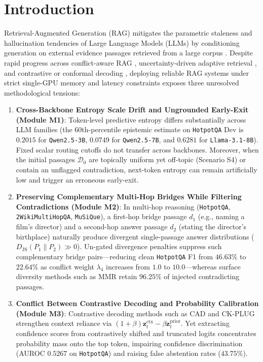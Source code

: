 \documentclass[11pt]{article}
\begin{document}
\section{Introduction}

Retrieval-Augmented Generation (RAG) mitigates the parametric staleness and hallucination tendencies of Large Language Models (LLMs) by conditioning generation on external evidence passages retrieved from a large corpus \cite{yang2018hotpotqa,mallen2023popqa}. Despite rapid progress across conflict-aware RAG \cite{wei2025instructrag,xiang2024robustrag,wang2025madamrag,bi2026ckplug}, uncertainty-driven adaptive retrieval \cite{su2024dragin,jeong2024adaptiverag,yao2025seakr,adarague2025}, and contrastive or conformal decoding \cite{shi2024cad,gema2025decore,sinha2025crg}, deploying reliable RAG systems under strict single-GPU memory and latency constraints exposes three unresolved methodological tensions:

\begin{enumerate}[leftmargin=*,nosep]
    \item \textbf{Cross-Backbone Entropy Scale Drift and Ungrounded Early-Exit (Module M1)}: Token-level predictive entropy differs substantially across LLM families (the 60th-percentile epistemic estimate on \texttt{HotpotQA} Dev is $0.2015$ for \texttt{Qwen2.5-3B}, $0.0749$ for \texttt{Qwen2.5-7B}, and $0.6281$ for \texttt{Llama-3.1-8B}). Fixed scalar routing cutoffs do not transfer across backbones. Moreover, when the initial passages $\mathcal{D}_0$ are topically uniform yet off-topic (Scenario S4) or contain an unflagged contradiction, next-token entropy can remain artificially low and trigger an erroneous early-exit.
    \item \textbf{Preserving Complementary Multi-Hop Bridges While Filtering Contradictions (Module M2)}: In multi-hop reasoning (\texttt{HotpotQA}, \texttt{2WikiMultiHopQA}, \texttt{MuSiQue}), a first-hop bridge passage $d_1$ (e.g., naming a film's director) and a second-hop answer passage $d_2$ (stating the director's birthplace) naturally produce divergent single-passage answer distributions ($D_{\text{JS}}(P_1 \parallel P_2) \gg 0$). Un-gated divergence penalties suppress such complementary bridge pairs---reducing clean \texttt{HotpotQA} F1 from $46.63\%$ to $22.64\%$ as conflict weight $\lambda_4$ increases from $1.0$ to $10.0$---whereas surface diversity methods such as MMR \cite{carbonell1998mmr} retain $96.25\%$ of injected contradicting passages.
    \item \textbf{Conflict Between Contrastive Decoding and Probability Calibration (Module M3)}: Contrastive decoding methods such as CAD \cite{shi2024cad} and CK-PLUG \cite{bi2026ckplug} strengthen context reliance via $(1+\beta)\mathbf{z}_t^{\text{ctx}} - \beta\mathbf{z}_t^{\text{prior}}$. Yet extracting confidence scores from contrastively shifted and truncated logits concentrates probability mass onto the top token, impairing confidence discrimination (AUROC $0.5267$ on \texttt{HotpotQA}) and raising false abstention rates ($43.75\%$).
\end{enumerate}
\end{document}
